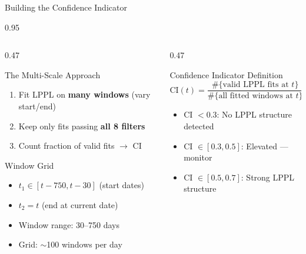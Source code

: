 \documentclass[9pt, aspectratio=169, t]{beamer}
\begin{document}
\begin{frame}{Building the Confidence Indicator}
    \begin{cminipage}{0.95\textwidth}
    {\scriptsize
    \begin{columns}[T]
        \begin{column}{0.47\textwidth}
            \begin{block}{The Multi-Scale Approach}
                \begin{enumerate}\setlength{\itemsep}{0pt}
                    \item Fit LPPL on \textbf{many windows} (vary start/end)
                    \item Keep only fits passing \textbf{all 8 filters}
                    \item Count fraction of valid fits $\to$ CI
                \end{enumerate}
            \end{block}
            \vspace{-1mm}
            \begin{exampleblock}{Window Grid}
                \begin{itemize}\setlength{\itemsep}{0pt}
                    \item $t_1 \in [t - 750, t - 30]$ (start dates)
                    \item $t_2 = t$ (end at current date)
                    \item Window range: 30--750 days
                    \item Grid: $\sim$100 windows per day
                \end{itemize}
            \end{exampleblock}
        \end{column}
        \begin{column}{0.47\textwidth}
            \begin{block}{Confidence Indicator Definition}
                \vspace{-2mm}
                $$\text{CI}(t) = \frac{\#\{\text{valid LPPL fits at }t\}}{\#\{\text{all fitted windows at }t\}}$$
                \vspace{-3mm}
                \begin{itemize}\setlength{\itemsep}{0pt}
                    \item CI $< 0.3$: No LPPL structure detected
                    \item CI $\in [0.3, 0.5]$: Elevated --- monitor
                    \item CI $\in [0.5, 0.7]$: Strong LPPL structure

\end{itemize}
\end{block}
\end{column}
\end{columns}}
\end{cminipage}
\end{frame}
\end{document}
